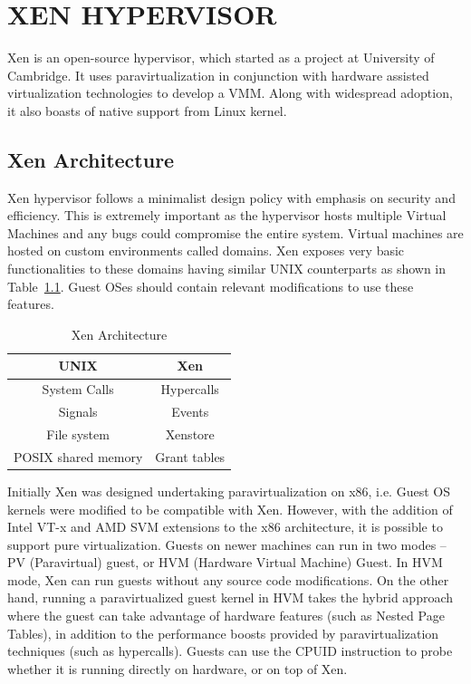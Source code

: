 \chapter{\uppercase{Xen Hypervisor}}
Xen is an open-source hypervisor, which started as a project at University of Cambridge. It uses paravirtualization in conjunction with hardware assisted virtualization technologies to develop a VMM. Along with widespread adoption, it also boasts of native support from Linux kernel. 

\section{Xen Architecture}

Xen hypervisor follows a minimalist design policy with emphasis on security and efficiency. This is extremely important as the hypervisor hosts multiple Virtual Machines and any bugs could compromise the entire system. Virtual machines are hosted on custom environments called domains. Xen exposes very basic functionalities to these domains having similar UNIX counterparts as shown in Table~\ref{tab:unixcomp}. Guest OSes should contain relevant modifications to use these features. 

\begin{table}[H]
\centering
\begin{tabular}{|c|c|}
    \hline
    UNIX & Xen \\
    \hline
    \hline
    System Calls & Hypercalls \\
    \hline
    Signals & Events \\
    \hline
    File system & Xenstore \\
    \hline
    POSIX shared memory & Grant tables  \\
    \hline
\end{tabular}
\caption{Xen Architecture}
\label{tab:unixcomp}
\end{table}

Initially Xen was designed undertaking paravirtualization on x86, i.e. Guest OS kernels were modified to be compatible with Xen. However, with the addition of Intel VT-x and AMD SVM extensions to the x86 architecture, it is possible to support pure virtualization. Guests on newer machines can run in two modes -- PV (Paravirtual) guest, or HVM (Hardware Virtual Machine) Guest. In HVM mode, Xen can run guests without any source code modifications. On the other hand, running a paravirtualized guest kernel in HVM takes the hybrid approach where the guest can take advantage of hardware features (such as Nested Page Tables), in addition to the performance boosts provided by paravirtualization techniques (such as hypercalls). Guests can use the CPUID instruction to probe whether it is running directly on hardware, or on top of Xen.

